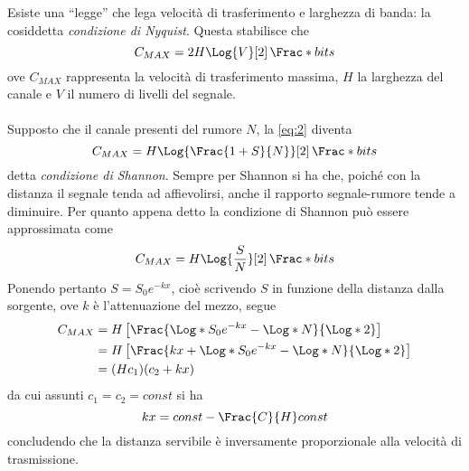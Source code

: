 \documentclass{subfiles}
\begin{document}
Esiste una ``legge'' che lega velocità di trasferimento e larghezza di banda: la cosiddetta \emph{condizione di Nyquist}.
Questa stabilisce che
\begin{equation}
    C_{MAX} = 2H \Log{V}[2] \, \Frac*{bit}{s}
\end{equation}
ove $C_{MAX}$ rappresenta la velocità di trasferimento massima, $H$ la larghezza del canale e $V$ il numero di livelli del segnale. \\ \\
Supposto che il canale presenti del rumore $N$, la \eqref{eq:2} diventa
$$
    C_{MAX} = H \Log{\Frac{1 + S}{N}}[2] \, \Frac*{bit}{s}
$$
detta \emph{condizione di Shannon}. Sempre per Shannon si ha che, poiché con la distanza il segnale tenda ad affievolirsi,
anche il rapporto segnale-rumore tende a diminuire.
Per quanto appena detto la condizione di Shannon può essere approssimata come
$$
    C_{MAX} = H \Log{\frac{S}{N}}[2] \, \Frac*{bit}{s}
$$
Ponendo pertanto $S = S_{0}e^{-kx}$, cioè scrivendo $S$ in funzione della distanza dalla sorgente, ove $k$ è l'attenuazione del mezzo, segue
$$\begin{aligned}
        C_{MAX} & = H \left[\Frac{\Log*{S_{0}e^{-kx}} - \Log*{N}}{\Log*{2}}\right]       \\
                & = H \left[\Frac{kx  + \Log*{S_{0}e^{-kx}} - \Log*{N}}{\Log*{2}}\right] \\
                & = (Hc_{1})(c_{2} + kx)
    \end{aligned}$$
da cui assunti $c_{1} = c_{2} = const$ si ha
$$
    kx = const - \Frac{C}{H} const
$$
concludendo che la distanza servibile è inversamente proporzionale alla velocità di trasmissione.
\end{document}
